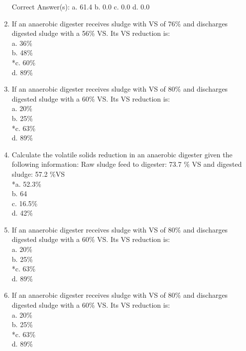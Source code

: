 \documentclass{article}
\begin{document}
\begin{enumerate}
Correct Answer(s):
a. 61.4
b. 0.0
c. 0.0
d. 0.0 \\

\item  If an anaerobic digester receives sludge with VS of 76\% and discharges digested sludge with a 56\% VS.  Its VS reduction is:\\

a. 36\% \\
b. 48\% \\
*c. 60\% \\
d. 89\% \\

\item  If an anaerobic digester receives sludge with VS of 80\% and discharges digested sludge with a 60\% VS.  Its VS reduction is:\\

a. 20\% \\
b. 25\% \\
*c. 63\% \\
d. 89\% \\

\item  Calculate the volatile solids reduction in an anaerobic digester given the following information:  Raw sludge feed to digester:  73.7 \% VS and digested sludge: 57.2 \%VS\\

*a. 52.3\% \\
b. 64 \\
c. 16.5\% \\
d. 42\% \\

\item  If an anaerobic digester receives sludge with VS of 80\% and discharges digested sludge with a 60\% VS.  Its VS reduction is:\\

a. 20\% \\
b. 25\% \\
*c. 63\% \\
d. 89\% \\

\item  If an anaerobic digester receives sludge with VS of 80\% and discharges digested sludge with a 60\% VS.  Its VS reduction is:\\

a. 20\% \\
b. 25\% \\
*c. 63\% \\
d. 89\% \\


\end{enumerate}
\end{document}
